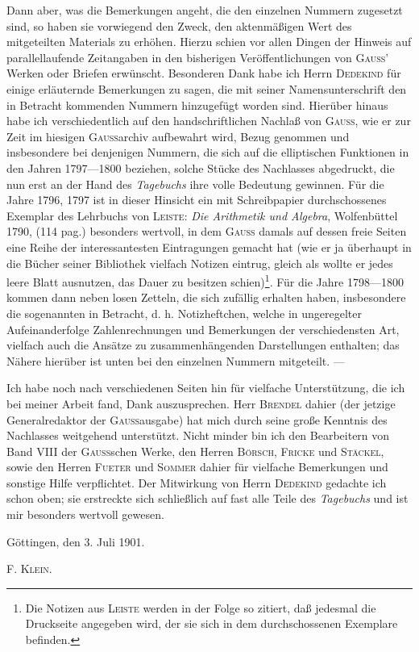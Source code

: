 \indent Dann aber, was die Bemerkungen angeht, die den einzelnen Nummern zugesetzt sind, so haben sie vorwiegend den Zweck, den aktenmäßigen Wert des mitgeteilten Materials zu erhöhen. Hierzu schien vor allen Dingen der Hinweis auf parallellaufende Zeitangaben in den bisherigen Veröffentlichungen von \textsc{Gauss}' Werken oder Briefen erwünscht. Besonderen Dank habe ich Herrn \textsc{Dedekind} für einige erläuternde Bemerkungen zu sagen, die mit seiner Namensunterschrift den in Betracht kommenden Nummern hinzugefügt worden sind. Hierüber hinaus habe ich verschiedentlich auf den handschriftlichen Nachlaß von \textsc{Gauss}, wie
\clearpage{}
\noindent er zur Zeit im hiesigen \textsc{Gauss}archiv aufbewahrt wird, Bezug genommen und insbesondere bei denjenigen Nummern, die sich auf die elliptischen Funktionen in den Jahren 1797—1800 beziehen, solche Stücke des Nachlasses abgedruckt, die nun erst an der Hand des \textit{Tagebuchs} ihre volle Bedeutung gewinnen. Für die Jahre 1796, 1797 ist in dieser Hinsicht ein mit Schreibpapier durchschossenes Exemplar des Lehrbuchs von \textsc{Leiste}: \textit{Die Arithmetik und Algebra}, Wolfenbüttel 1790, (114 pag.) besonders wertvoll, in dem \textsc{Gauss} damals auf dessen freie Seiten eine Reihe der interessantesten Eintragungen gemacht hat (wie er ja überhaupt in die Bücher seiner Bibliothek vielfach Notizen eintrug, gleich als wollte er jedes leere Blatt ausnutzen, das Dauer zu besitzen schien)\footnote{Die Notizen aus \textsc{Leiste} werden in der Folge so zitiert, daß jedesmal die Druckseite angegeben wird,  der sie sich in dem durchschossenen Exemplare befinden.}. Für die Jahre 1798—1800 kommen dann neben losen Zetteln, die sich zufällig erhalten haben, insbesondere die sogenannten  in Betracht, d. h. Notizheftchen, welche in ungeregelter Aufeinanderfolge Zahlenrechnungen und Bemerkungen der verschiedensten Art, vielfach auch die Ansätze zu zusammenhängenden Darstellungen enthalten; das Nähere hierüber ist unten bei den einzelnen Nummern mitgeteilt. —

\indent Ich habe noch nach verschiedenen Seiten hin für vielfache Unterstützung, die ich bei meiner Arbeit fand, Dank auszusprechen. Herr \textsc{Brendel} dahier (der jetzige Generalredaktor der \textsc{Gauss}ausgabe) hat mich durch seine große Kenntnis des Nachlasses weitgehend unterstützt. Nicht minder bin ich den Bearbeitern von Band VIII der \textsc{Gauss}schen Werke, den Herren \textsc{Börsch}, \textsc{Fricke} und \textsc{Stäckel}, sowie den Herren \textsc{Fueter} und \textsc{Sommer} dahier für vielfache Bemerkungen und sonstige Hilfe verpflichtet. Der Mitwirkung von Herrn \textsc{Dedekind} gedachte ich schon oben; sie erstreckte sich schließlich auf fast alle Teile des \textit{Tagebuchs} und ist mir besonders wertvoll gewesen.
\par\indent Göttingen, den 3. Juli 1901.
\par\noindent\hfill F. \textsc{Klein}.

